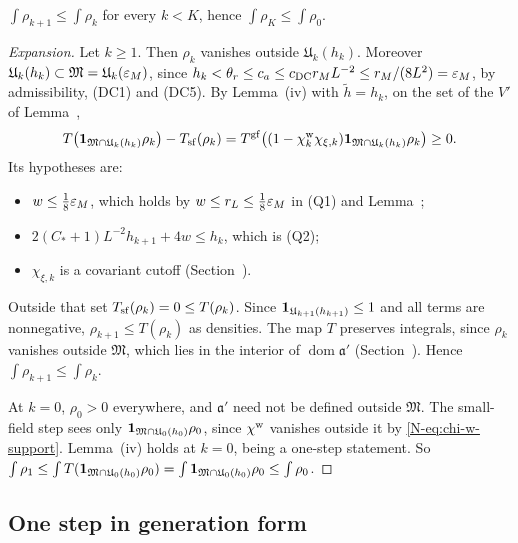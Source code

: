 \begin{detail}\label{xb:d-modified}
$\int\rho_{k+1}\le\int\rho_k$ for every $k<K$, hence $\int\rho_K\le\int\rho_0$.
\end{detail}

\begin{proof}[Expansion]
Let $k\ge1$. Then $\rho_k$ vanishes outside $\mathfrak U_k(h_k)$. Moreover $\mathfrak U_k(h_k)\subset\mathfrak M=\mathfrak U_k(\varepsilon_M)$, since $h_k<\theta_r\le c_a\le c_{\rm DC}r_ML^{-2}\le r_M/(8L^2)=\varepsilon_M$, by admissibility, (DC1) and (DC5). By Lemma~(iv) with $\tilde h=h_k$, on the set of the $V'$ of Lemma~,
\[
T\big(\mathbf 1_{\mathfrak M\cap\mathfrak U_k(h_k)}\rho_k\big)-T_{\rm sf}(\rho_k)=T^{\rm gf}\big((1-\chi^{\rm w}_k\chi_{\xi,k})\mathbf 1_{\mathfrak M\cap\mathfrak U_k(h_k)}\rho_k\big)\ge0 .
\]
Its hypotheses are:
\begin{itemize}
\item $w\le\frac18\varepsilon_M$, which holds by $w\le r_L\le\frac18\varepsilon_M$ in (Q1) and Lemma~;
\item $2(C_*+1)L^{-2}h_{k+1}+4w\le h_k$, which is (Q2);
\item $\chi_{\xi,k}$ is a covariant cutoff (Section~).
\end{itemize}
Outside that set $T_{\rm sf}(\rho_k)=0\le T(\rho_k)$. Since $\mathbf 1_{\mathfrak U_{k+1}(h_{k+1})}\le1$ and all terms are nonnegative, $\rho_{k+1}\le T(\rho_k)$ as densities. The map $T$ preserves integrals, since $\rho_k$ vanishes outside $\mathfrak M$, which lies in the interior of $\operatorname{dom}\mathfrak a'$ (Section~). Hence $\int\rho_{k+1}\le\int\rho_k$.

At $k=0$, $\rho_0>0$ everywhere, and $\mathfrak a'$ need not be defined outside $\mathfrak M$. The small-field step sees only $\mathbf 1_{\mathfrak M\cap\mathfrak U_0(h_0)}\rho_0$, since $\chi^{\rm w}$ vanishes outside it by \eqref{N-eq:chi-w-support}. Lemma~(iv) holds at $k=0$, being a one-step statement. So $\int\rho_1\le\int T(\mathbf 1_{\mathfrak M\cap\mathfrak U_0(h_0)}\rho_0)=\int\mathbf 1_{\mathfrak M\cap\mathfrak U_0(h_0)}\rho_0\le\int\rho_0$.
\end{proof}

\subsection{One step in generation form}\label{xb:onestep}

